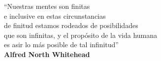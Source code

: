 \begin{flushleft}
\large
``Nuestras mentes son finitas \\
e inclusive en estas circunstancias \\
de finitud estamos rodeados de posibilidades \\
que son infinitas, y el propósito de la vida humana \\
es asir lo más posible de tal infinitud''\\

\textbf{Alfred North Whitehead}
\end{flushleft}